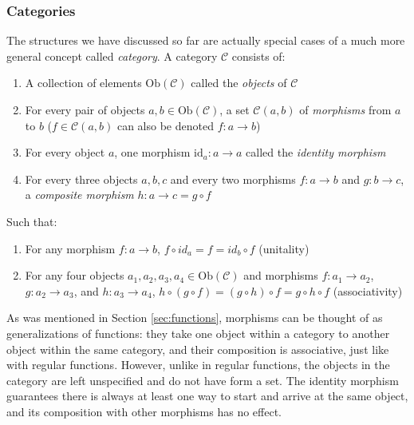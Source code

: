 \documentclass[12pt,a4paper]{article}
\begin{document}
\subsubsection{Categories}
\label{sec:categories}

The structures we have discussed so far are actually special cases of a much more general concept called \textit{category}. A category $\mathcal{C}$ consists of:

\begin{enumerate}
\item A collection of elements $\text{Ob}(\mathcal{C})$ called the \textit{objects} of $\mathcal{C}$
\item For every pair of objects $a, b \in \text{Ob}(\mathcal{C})$, a set $\mathcal{C}(a, b)$ of \textit{morphisms} from $a$ to $b$ ($f \in \mathcal{C}(a, b)$ can also be denoted $f: a \to b$)
\item For every object $a$, one morphism $\text{id}_a : a \to a$ called the \textit{identity morphism}
\item For every three objects $a, b, c$ and every two morphisms $f : a \to b$ and $g : b \to c$, a \textit{composite morphism} $h : a \to c = g \circ f $ 
\end{enumerate}

Such that:

\begin{enumerate}
\renewcommand{\theenumi}{\alph{enumi}}
\item For any morphism $f: a \to b$, $f \circ id_a = f = id_b \circ f$ (unitality)
\item For any four objects $a_1, a_2, a_3, a_4 \in \text{Ob}(\mathcal{C})$ and morphisms $f: a_1 \to a_2$, $g: a_2 \to a_3$, and $h: a_3 \to a_4$, $h \circ (g \circ f) = (g \circ h) \circ f = g \circ h \circ f$ (associativity)
\end{enumerate}


As was mentioned in Section \ref{sec:functions}, morphisms can be thought of as generalizations of functions: they take one object within a category to another object within the same category, and their composition is associative, just like with regular functions. However, unlike in regular functions, the objects in the category are left unspecified and do not have form a set. The identity morphism guarantees there is always at least one way to start and arrive at the same object, and its composition with other morphisms has no effect.
\end{document}
